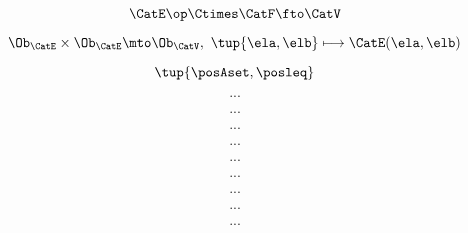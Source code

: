 \begin{forslides}
     \begin{equation}
        \label{eq:slides_enrichment_55}
       \CatE\op \Ctimes \CatF \fto \CatV
    \end{equation}
    
     \begin{equation}
        \label{eq:slides_enrichment_56}
       \Ob_\CatE \times \Ob_\CatE \mto \Ob_\CatV, \ \tup{\ela, \elb} \longmapsto \CatE(\ela, \elb) 
    \end{equation}
    
     \begin{equation}
        \label{eq:slides_enrichment_57}
       \tup{\posAset, \posleq}
    \end{equation}
    
     \begin{equation}
        \label{eq:slides_enrichment_58}
       ...
    \end{equation}
    
     \begin{equation}
        \label{eq:slides_enrichment_59}
       ...
    \end{equation}
    
    \begin{equation}
        \label{eq:slides_enrichment_60}
       ...
    \end{equation}
    
     \begin{equation}
        \label{eq:slides_enrichment_61}
       ...
    \end{equation}
    
     \begin{equation}
        \label{eq:slides_enrichment_62}
       ...
    \end{equation}
    
     \begin{equation}
        \label{eq:slides_enrichment_63}
       ...
    \end{equation}
    
     \begin{equation}
        \label{eq:slides_enrichment_64}
       ...
    \end{equation}
    
     \begin{equation}
        \label{eq:slides_enrichment_65}
       ...
    \end{equation}
    
     \begin{equation}
        \label{eq:slides_enrichment_66}
       ...
    \end{equation}
    

\end{forslides}
